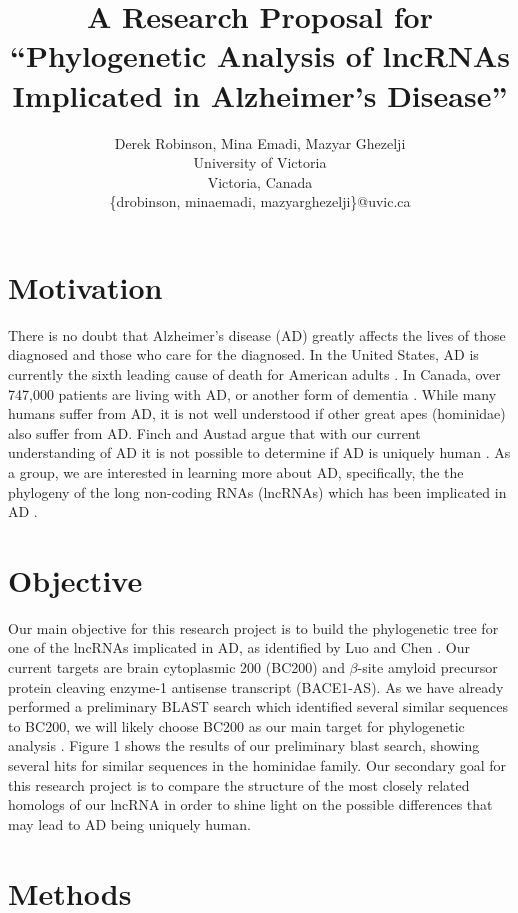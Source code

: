 \documentclass[conference]{IEEEtran}
\title{A Research Proposal for \\``Phylogenetic Analysis of lncRNAs Implicated in Alzheimer's Disease''}
\author{Derek Robinson, Mina Emadi, Mazyar Ghezelji\\
University of Victoria\\
Victoria, Canada \\
\{drobinson, minaemadi, mazyarghezelji\}@uvic.ca}
\begin{document}
\maketitle

\section{Motivation}

There is no doubt that Alzheimer's disease (AD) greatly affects the lives of those diagnosed and those who care for the diagnosed. 
In the United States, AD is currently the sixth leading cause of death for American adults \cite{AlzheimersDisease}. 
In Canada, over 747,000 patients are living with AD, or another form of dementia \cite{ADcanada}. 
While many humans suffer from AD, it is not well understood if other great apes (hominidae) also suffer from AD. 
Finch and Austad argue that with our current understanding of AD it is not possible to determine if AD is uniquely human \cite{finch2015commentary}.
As a group, we are interested in learning more about AD, specifically, the the phylogeny of the long non-coding RNAs (lncRNAs) which has been implicated in AD \cite{luo2016long}. 

\section{Objective}

Our main objective for this research project is to build the phylogenetic tree for one of the lncRNAs implicated in AD, as identified by Luo and Chen \cite{luo2016long}. 
Our current targets are brain cytoplasmic 200 (BC200) and $\beta$-site amyloid precursor protein cleaving enzyme-1 antisense transcript (BACE1-AS). 
As we have already performed a preliminary BLAST search which identified several similar sequences to BC200, we will likely choose BC200 as our main target for phylogenetic analysis \cite{madden2012blast,blastTool}. 
Figure 1 shows the results of our preliminary blast search, showing several hits for similar sequences in the hominidae family.
Our secondary goal for this research project is to compare the structure of the most closely related homologs of our lncRNA in order to shine light on the possible differences that may lead to AD being uniquely human.

\section{Methods}
\end{document}
